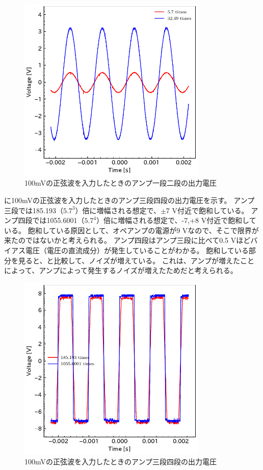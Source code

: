 \documentclass[report.tex]{subfiles}
\begin{document}
\begin{figure}[H]
	\centering
	\includegraphics[width=9cm]{fig/level12_100m.pdf}
	\caption{100mVの正弦波を入力したときのアンプ一段二段の出力電圧}
	\label{fig:12_100m}
\end{figure}

に100mVの正弦波を入力したときのアンプ三段四段の出力電圧を示す。
アンプ三段では185.193（\(5.7^3\)）倍に増幅される想定で、\(\pm\)7 V付近で飽和している。
アンプ四段では1055.6001（\(5.7^4\)）倍に増幅される想定で、-7,+8 V付近で飽和している。
飽和している原因として、オペアンプの電源が9 Vなので、そこで限界が来たのではないかと考えられる。
アンプ四段はアンプ三段に比べて0.5 Vほどバイアス電圧（電圧の直流成分）が発生していることがわかる。
飽和している部分を見ると、と比較して、ノイズが増えている。
これは、アンプが増えたことによって、アンプによって発生するノイズが増えたためだと考えられる。

\begin{figure}[H]
	\centering
	\includegraphics[width=9cm]{fig/level34_100m.pdf}
	\caption{100mVの正弦波を入力したときのアンプ三段四段の出力電圧}
	\label{fig:34_100m}
\end{figure}
\end{document}
